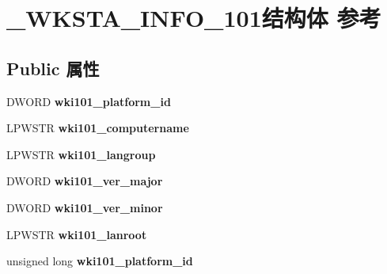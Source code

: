 \hypertarget{struct___w_k_s_t_a___i_n_f_o__101}{}\section{\+\_\+\+W\+K\+S\+T\+A\+\_\+\+I\+N\+F\+O\+\_\+101结构体 参考}
\label{struct___w_k_s_t_a___i_n_f_o__101}
\subsection*{Public 属性}
\begin{DoxyCompactItemize}
\item 
\mbox{\label{struct___w_k_s_t_a___i_n_f_o__101_a22437658011c9ba592bc157923247bd4}} 
D\+W\+O\+RD {\bfseries wki101\+\_\+platform\+\_\+id}
\item 
\mbox{\label{struct___w_k_s_t_a___i_n_f_o__101_a86d89c46aa0ee42e818490bcaca4bbb7}} 
L\+P\+W\+S\+TR {\bfseries wki101\+\_\+computername}
\item 
\mbox{\label{struct___w_k_s_t_a___i_n_f_o__101_a873ec1c340b55d83bf963f4f3f89083f}} 
L\+P\+W\+S\+TR {\bfseries wki101\+\_\+langroup}
\item 
\mbox{\label{struct___w_k_s_t_a___i_n_f_o__101_aea994ab8678b098cf4085f083e50de93}} 
D\+W\+O\+RD {\bfseries wki101\+\_\+ver\+\_\+major}
\item 
\mbox{\label{struct___w_k_s_t_a___i_n_f_o__101_a17d55845506a185f5fe2a7c1eb6f879b}} 
D\+W\+O\+RD {\bfseries wki101\+\_\+ver\+\_\+minor}
\item 
\mbox{\label{struct___w_k_s_t_a___i_n_f_o__101_a6c4474b501a993867c23c558e5814f40}} 
L\+P\+W\+S\+TR {\bfseries wki101\+\_\+lanroot}
\item 
\mbox{\label{struct___w_k_s_t_a___i_n_f_o__101_ab3cfa9ef3debd141a641ff969a2ff7c7}} 
unsigned long {\bfseries wki101\+\_\+platform\+\_\+id}
\item 
\mbox{\label{struct___w_k_s_t_a___i_n_f_o__101_ae18c6a07191c9ea6e56109ff6c666556}} 

\end{DoxyCompactItemize}
